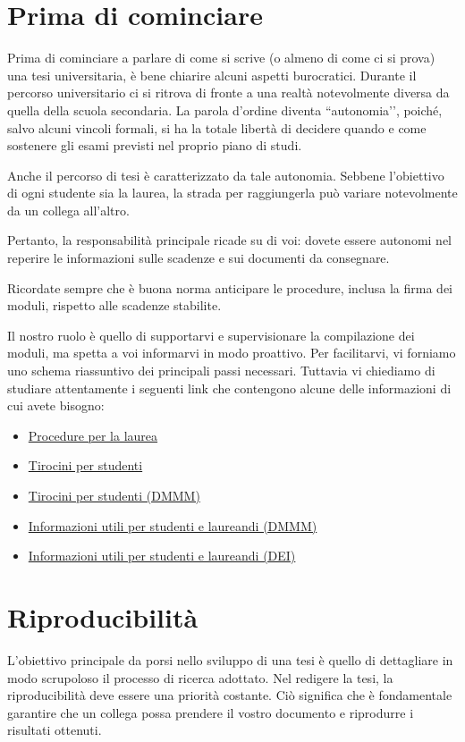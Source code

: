 \documentclass{article}
\newcounter{nota}
\begin{document}
\section{Prima di cominciare}
Prima di cominciare a parlare di come si scrive (o almeno di come ci si prova) una tesi universitaria, è bene chiarire alcuni aspetti burocratici. Durante il percorso universitario ci si ritrova di fronte a una realtà notevolmente diversa da quella della scuola secondaria. La parola d’ordine diventa ``autonomia’', poiché, salvo alcuni vincoli formali, si ha la totale libertà di decidere quando e come sostenere gli esami previsti nel proprio piano di studi.

Anche il percorso di tesi è caratterizzato da tale autonomia. Sebbene l’obiettivo di ogni studente sia la laurea, la strada per raggiungerla può variare notevolmente da un collega all’altro.
\begin{nota}
Pertanto, la responsabilità principale ricade su di voi: dovete essere autonomi nel reperire le informazioni sulle scadenze e sui documenti da consegnare.\end{nota}
\begin{nota}
Ricordate sempre che è buona norma anticipare le procedure, inclusa la firma dei moduli, rispetto alle scadenze stabilite.
\end{nota}

Il nostro ruolo è quello di supportarvi e supervisionare la compilazione dei moduli, ma spetta a voi informarvi in modo proattivo. Per facilitarvi, vi forniamo uno schema riassuntivo dei principali passi necessari. Tuttavia vi chiediamo di studiare attentamente i seguenti link che contengono alcune delle informazioni di cui avete bisogno:
\begin{itemize}
\item \href{http://www.poliba.it/it/procedure-la-laurea}{Procedure per la laurea}
\item \href{http://www.poliba.it/it/tirocini-curriculari}{Tirocini per studenti}
\item \href{https://www.dmmm.poliba.it/index.php/it/tirocini-interni}{Tirocini per studenti (DMMM)}
\item \href{https://www.dmmm.poliba.it/index.php/it/didattica}{Informazioni utili per studenti e laureandi (DMMM)}
\item \href{https://dei.poliba.it/informazioni-per-gli-studenti/}{Informazioni utili per studenti e laureandi (DEI)}
\end{itemize}

\section{Riproducibilità}
L’obiettivo principale da porsi nello sviluppo di una tesi è quello di dettagliare in modo scrupoloso il processo di ricerca adottato. Nel redigere la tesi, la riproducibilità deve essere una priorità costante. Ciò significa che è fondamentale garantire che un collega possa prendere il vostro documento e riprodurre i risultati ottenuti.
\end{document}
